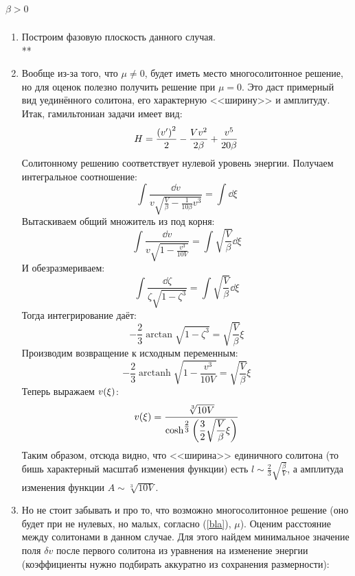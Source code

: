 \documentclass[titlepage]{article}
\DeclareMathOperator\arctanh{arctanh}
\begin{document}
\subparagraph{$\beta > 0$}
\begin{enumerate}
 \item Построим фазовую плоскость данного случая.
 \\
{\LARGE ***}
\\

\item Вообще из\--за того, что $\mu \not = 0$, будет иметь место многосолитонное решение, но для оценок полезно получить решение при $\mu = 0$. Это даст примерный вид уединённого солитона, его характерную <<ширину>> и амплитуду. Итак, гамильтониан задачи имеет вид:
\begin{equation}
 H = \frac{\qty(v')^2}{2} - \frac{V v^2}{2\beta} + \frac{v^5}{20\beta} 
\end{equation}
Солитонному решению соответствует нулевой уровень энергии. Получаем интегральное соотношение:
\begin{equation}
 \int \dfrac{\dd{v}}{v\sqrt{\frac{V}{\beta} - \frac{1}{10\beta} v^3}} = \int \dd{\xi}
\end{equation}
Вытаскиваем общий множитель из под корня:
\begin{equation}
 \int \dfrac{\dd{v}}{v\sqrt{1 - \frac{v^3}{10V}}} = \int \sqrt{\frac{V}{\beta}} \dd{\xi}
\end{equation}
И обезразмериваем:
\begin{equation}
 \int  \dfrac{\dd{\zeta}}{\zeta\sqrt{1 - \zeta^3}} = \int \sqrt{\frac{V}{\beta}} \dd{\xi}
\end{equation}
Тогда интегрирование даёт:
\begin{equation}
 -\dfrac23 \arctan{\sqrt{1-\zeta^3}} = \sqrt{\frac{V}{\beta}} \xi
\end{equation}
Производим возвращение к исходным переменным:
\begin{equation}
 -\dfrac23 \arctanh{\sqrt{1-\frac{v^3}{10V}}} = \sqrt{\frac{V}{\beta}} \xi
\end{equation}
Теперь выражаем $v\qty(\xi)$:
\begin{equation}\label{soliton}
 v\qty(\xi) = \dfrac{\sqrt[3]{10V}}{\cosh^{\tfrac23}{\qty(\dfrac32\sqrt{\dfrac{V}{\beta}}\xi)}}
\end{equation}
Таким образом, отсюда видно, что <<ширина>> единичного солитона (то бишь характерный масштаб изменения функции) есть ${ l \sim \tfrac{2}{3}\sqrt{\tfrac{\beta}{V}}}$, а амплитуда изменения функции ${ A \sim \sqrt[3]{10V}}$.
\item Но не стоит забывать и про то, что возможно многосолитонное решение (оно будет при не нулевых, но малых, согласно (\ref{bla}), $\mu$). Оценим расстояние между солитонами в данном случае. Для этого найдем минимальное значение поля $\delta v$ после первого солитона из уравнения на изменение энергии (коэффициенты нужно подбирать аккуратно из сохранения размерности):

\end{enumerate}
\end{document}
